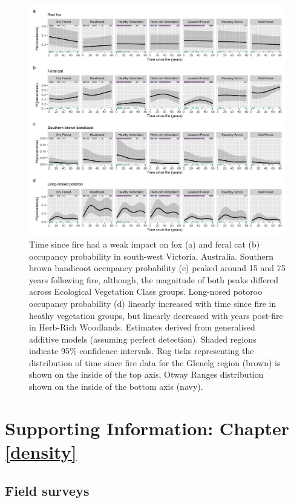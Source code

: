 \documentclass[11pt,a4paper,titlepage,twoside,openright]{style/unimelbthesis}
\begin{document}
\begin{mainmatter}
\begin{figure}
{\centering \includegraphics[width=1\linewidth]{figure/tsf} 

}

\caption{Time since fire had a weak impact on fox (a) and feral cat (b) occupancy probability in south-west Victoria, Australia. Southern brown bandicoot occupancy probability (c) peaked around 15 and 75 years following fire, although, the magnitude of both peaks differed across Ecological Vegetation Class groups. Long-nosed potoroo occupancy probability (d) linearly increased with time since fire in heathy vegetation groups, but linearly decreased with years post-fire in Herb-Rich Woodlands. Estimates derived from generalised additive models (assuming perfect detection). Shaded regions indicate 95\% confidence intervals. Rug ticks representing the distribution of time since fire data for the Glenelg region (brown) is shown on the inside of the top axis, Otway Ranges distribution shown on the inside of the bottom axis (navy).}\label{fig:occ-tsf}
\end{figure}
\hypertarget{density-app}{%
\chapter{Supporting Information: Chapter \ref{density}}\label{density-app}}

\newpage

\hypertarget{density-app-field}{%
\section{Field surveys}\label{density-app-field}}


\end{mainmatter}
\end{document}
